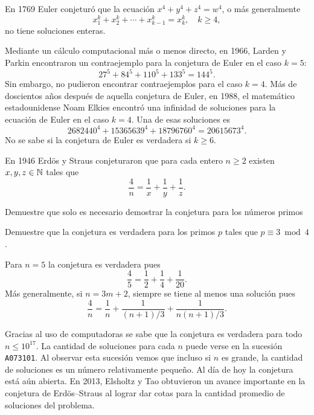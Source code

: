 \begin{example}
En 1769 Euler conjeturó que la ecuación 
$x^4+y^4+z^4=w^4$,
o más generalmente 
\[
	x_1^k+x_2^k+\cdots+x_{k-1}^k=x_k^k,\quad
	k\geq4,
\]
no tiene soluciones enteras. 

Mediante un cálculo computacional más o menos directo, en 1966, Larden y Parkin
encontraron un contraejemplo para la conjetura de Euler en el caso $k=5$: 
\[
	27^5+84^5+110^5+133^5=144^5.
\]
Sin embargo, no pudieron encontrar contraejemplos para el caso $k=4$.  Más de
doscientos años después de aquella conjetura de Euler, en 1988, el matemático
estadounidense Noam Elkies encontró una infinidad de soluciones para la
ecuación de Euler en el caso $k=4$. Una de esas soluciones es 
\[
	2682440^4+15365639^4+18796760^4=20615673^4.
\]
No se sabe si la conjetura de Euler es verdadera si $k\geq6$. 

\end{example}

\begin{example}
En 1946 Erd\"os y Straus conjeturaron que para cada entero $n\geq2$ existen
$x,y,z\in\mathbb{N}$ tales que 
\[
	\frac4n=\frac1x+\frac1y+\frac1z.
\]

\begin{exercise}
	Demuestre que solo es necesario demostrar la conjetura para los números primos
\end{exercise}

\begin{exercise}
	Demuestre que la conjetura es verdadera para los primos $p$ tales que
	$p\equiv3\bmod 4$. 
\end{exercise}

Para $n=5$ la conjetura es verdadera pues 
\[
	\frac45=\frac12+\frac14+\frac1{20}.
\]
Más generalmente, si $n=3m+2$, siempre se tiene al menos una solución pues 
\[
	\frac4n=\frac1n+\frac{1}{(n+1)/3}+\frac{1}{n(n+1)/3}.
\]

Gracias al uso de computadoras se sabe que la conjetura es verdadera para todo
$n\leq10^{17}$.  La cantidad de soluciones para cada $n$ puede verse en la
sucesión \verb+A073101+. Al observar esta sucesión vemos que incluso si $n$ es
grande, la cantidad de soluciones es un número relativamente pequeño.  Al día
de hoy la conjetura está aún abierta. En 2013, Elsholtz y Tao obtuvieron un
avance importante en la conjetura de Erd\"os--Straus al lograr dar cotas para
la cantidad promedio de soluciones del problema. 
\end{example}


